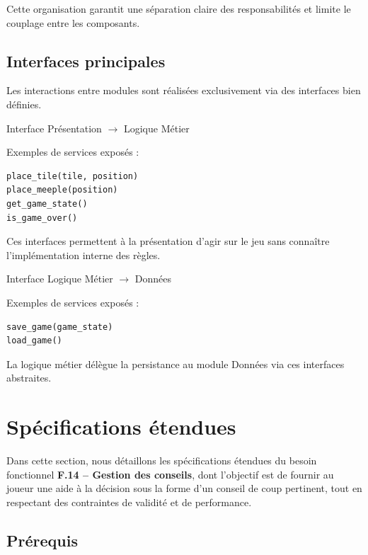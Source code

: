 \documentclass[11pt]{article}
\begin{document}
Cette organisation garantit une séparation claire des responsabilités et limite le couplage entre les composants.

\subsection{Interfaces principales}

Les interactions entre modules sont réalisées exclusivement via des interfaces bien définies.

Interface Présentation $\rightarrow$ Logique Métier

Exemples de services exposés :

{\normalsize
  \begin{verbatim}
place_tile(tile, position)
place_meeple(position)
get_game_state()
is_game_over()
  \end{verbatim}
}



Ces interfaces permettent à la présentation d’agir sur le jeu sans connaître l’implémentation interne des règles.

Interface Logique Métier $\rightarrow$ Données

Exemples de services exposés :

{\normalsize
  \begin{verbatim}
save_game(game_state)
load_game()
  \end{verbatim}
}




La logique métier délègue la persistance au module Données via ces interfaces abstraites.


\section{Spécifications étendues}



Dans cette section, nous détaillons les spécifications étendues du besoin fonctionnel \textbf{F.14 – Gestion des conseils},
dont l’objectif est de fournir au joueur une aide à la décision sous la forme d’un conseil de coup pertinent, tout en respectant des contraintes de validité et de performance.



\subsection{Prérequis}
\end{document}
